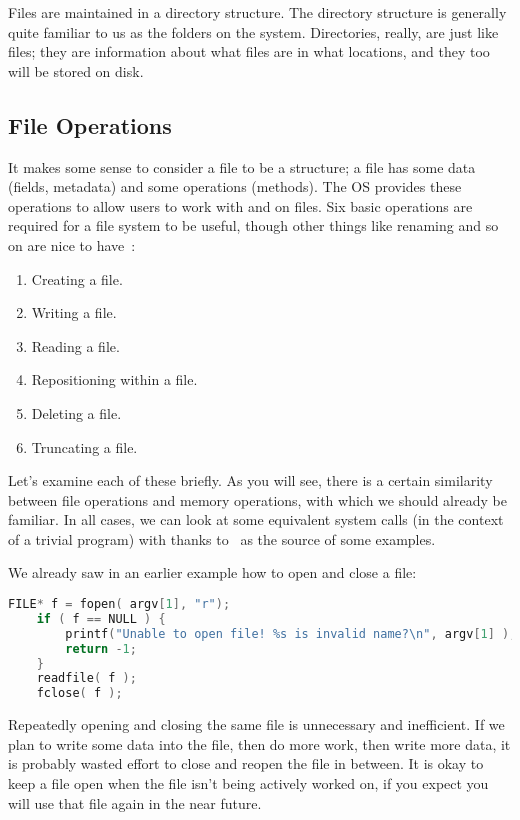 Files are maintained in a directory structure. The directory structure is generally quite familiar to us as the folders on the system. Directories, really, are just like files; they are information about what files are in what locations, and they too will be stored on disk.

\subsection*{File Operations}
It makes some sense to consider a file to be a structure; a file has some data (fields, metadata) and some operations (methods). The OS provides these operations to allow users to work with and on files. Six basic operations are required for a file system to be useful, though other things like renaming and so on are nice to have~\cite{osc}:

\begin{enumerate}
	\item Creating a file.
	\item Writing a file.
	\item Reading a file.
	\item Repositioning within a file.
	\item Deleting a file.
	\item Truncating a file.
\end{enumerate}

Let's examine each of these briefly. As you will see, there is a certain similarity between file operations and memory operations, with which we should already be familiar. In all cases, we can look at some equivalent system calls (in the context of a trivial program) with thanks to~\cite{cfiles} as the source of some examples.

We already saw in an earlier example how to open and close a file:
\begin{lstlisting}[language=C]
    FILE* f = fopen( argv[1], "r");
    if ( f == NULL ) {
        printf("Unable to open file! %s is invalid name?\n", argv[1] );
        return -1;
    }
    readfile( f );
    fclose( f );
\end{lstlisting}

Repeatedly opening and closing the same file is unnecessary and inefficient. If we plan to write some data into the file, then do more work, then write more data, it is probably wasted effort to close and reopen the file in between. It is okay to keep a file open when the file isn't being actively worked on, if you expect you will use that file again in the near future.

